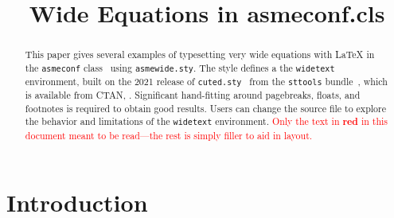 



\title{Wide Equations in asmeconf.cls}
\maketitle


    
\begin{abstract}
This paper gives several examples of typesetting very wide equations with {\upshape\LaTeX} in the {\upshape\texttt{asmeconf}} class~{\upshape\cite{lienhard2021}} using {\upshape\texttt{asmewide.sty}}.
The style defines a the {\upshape\texttt{widetext}} environment, built on the 2021 release of {\upshape\texttt{cuted.sty}~\cite{tolucsis1}} from the
{\upshape\texttt{sttools}} bundle~{\upshape\cite{tolucsis2}}, which is available from CTAN, .  
Significant hand-fitting around pagebreaks, floats, and footnotes is required to obtain good results. Users can change the source file to explore the behavior and limitations of the {\upshape\texttt{widetext}} environment. \textcolor{red}{Only the text in \textbf{red} in this document meant 
to be read---the rest is simply filler to aid in layout.}
\end{abstract}


\section{Introduction}
\lipsum[1-2]
